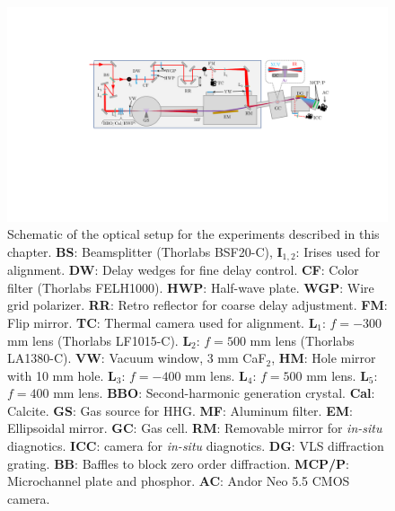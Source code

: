 \begin{figure}
	\centering
	\includegraphics[width=1.0\textwidth]{figures/ATS/ATS_optical_layout.pdf}
	\caption[TABLe experimental setup for ATS experiments]{Schematic of the optical setup for the experiments described in this chapter.  \textbf{BS}: Beamsplitter (Thorlabs BSF20-C), \textbf{I$_{1,2}$}: Irises used for alignment. \textbf{DW}: Delay wedges for fine delay control. \textbf{CF}: Color filter (Thorlabs FELH1000). \textbf{HWP}: Half-wave plate. \textbf{WGP}: Wire grid polarizer. \textbf{RR}: Retro reflector for coarse delay adjustment.  \textbf{FM}: Flip mirror. \textbf{TC}: Thermal camera used for alignment.  \textbf{L$_1$}: $f=-300$ mm lens (Thorlabs LF1015-C). \textbf{L$_2$}: $f=500$ mm lens (Thorlabs LA1380-C). \textbf{VW}: Vacuum window, 3 mm CaF$_2$, \textbf{HM}: Hole mirror with 10 mm hole.  \textbf{L$_3$}: $f=-400$ mm lens.  \textbf{L$_4$}: $f=500$ mm lens. \textbf{L$_5$}: $f=400$ mm lens.  \textbf{BBO}: Second-harmonic generation crystal.  \textbf{Cal}: Calcite. \textbf{GS}: Gas source for HHG. \textbf{MF}: Aluminum filter. \textbf{EM}: Ellipsoidal mirror. \textbf{GC}: Gas cell. \textbf{RM}: Removable mirror for \textit{in-situ} diagnotics.    \textbf{ICC}: camera for \textit{in-situ} diagnotics. \textbf{DG}: VLS diffraction grating. \textbf{BB}: Baffles to block zero order diffraction.  \textbf{MCP/P}: Microchannel plate and phosphor.  \textbf{AC}: Andor Neo 5.5 CMOS camera.}
	\label{fig:generation_setup}
\end{figure}

